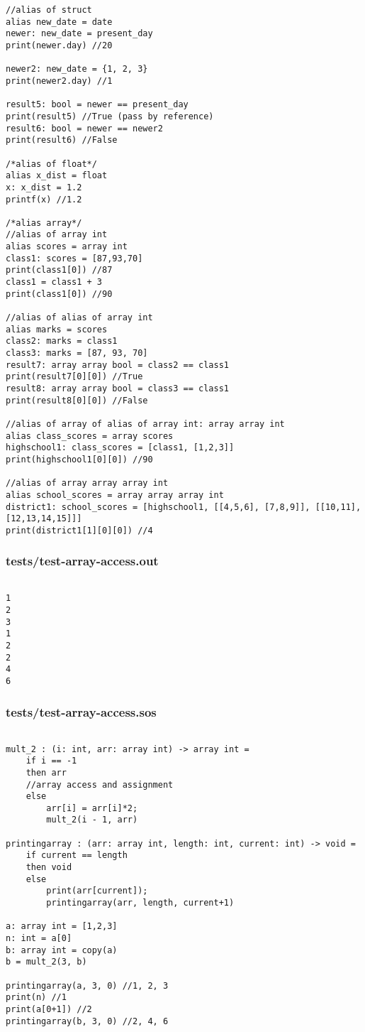 \documentclass[main.tex]{subfiles}
\begin{document}
\begin{lstlisting}
//alias of struct
alias new_date = date
newer: new_date = present_day
print(newer.day) //20

newer2: new_date = {1, 2, 3}
print(newer2.day) //1

result5: bool = newer == present_day
print(result5) //True (pass by reference)
result6: bool = newer == newer2 
print(result6) //False

/*alias of float*/
alias x_dist = float
x: x_dist = 1.2
printf(x) //1.2

/*alias array*/
//alias of array int
alias scores = array int
class1: scores = [87,93,70]
print(class1[0]) //87
class1 = class1 + 3
print(class1[0]) //90

//alias of alias of array int
alias marks = scores
class2: marks = class1
class3: marks = [87, 93, 70]
result7: array array bool = class2 == class1
print(result7[0][0]) //True
result8: array array bool = class3 == class1
print(result8[0][0]) //False

//alias of array of alias of array int: array array int
alias class_scores = array scores
highschool1: class_scores = [class1, [1,2,3]]
print(highschool1[0][0]) //90

//alias of array array array int
alias school_scores = array array array int
district1: school_scores = [highschool1, [[4,5,6], [7,8,9]], [[10,11], [12,13,14,15]]]
print(district1[1][0][0]) //4
\end{lstlisting}

\subsubsection{tests/test-array-access.out}

\begin{lstlisting}

1
2
3
1
2
2
4
6
\end{lstlisting}

\subsubsection{tests/test-array-access.sos}

\begin{lstlisting}

mult_2 : (i: int, arr: array int) -> array int = 
    if i == -1
    then arr
    //array access and assignment
    else 
        arr[i] = arr[i]*2; 
        mult_2(i - 1, arr)

printingarray : (arr: array int, length: int, current: int) -> void =
    if current == length
    then void
    else 
        print(arr[current]);
        printingarray(arr, length, current+1)

a: array int = [1,2,3]
n: int = a[0]
b: array int = copy(a)
b = mult_2(3, b)

printingarray(a, 3, 0) //1, 2, 3
print(n) //1
print(a[0+1]) //2
printingarray(b, 3, 0) //2, 4, 6
\end{lstlisting}
\end{document}
